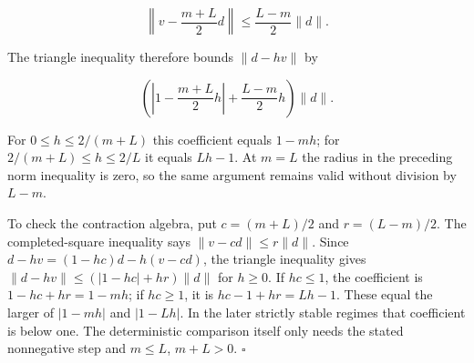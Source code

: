 \documentclass[11pt,a4paper]{article}
\begin{document}
\[\left\|v-\frac{m+L}{2}d\right\|\le\frac{L-m}{2}\|d\|.\]

The triangle inequality therefore bounds \(\|d-hv\|\) by

\[\left(\left|1-\frac{m+L}{2}h\right|+\frac{L-m}{2}h\right)\|d\|.\]

For \(0\le h\le2/(m+L)\) this coefficient equals \(1-mh\); for \(2/(m+L)\le h\le2/L\) it equals \(Lh-1\). At \(m=L\) the radius in the preceding norm inequality is zero, so the same argument remains valid without division by \(L-m\).




To check the contraction algebra, put \(c=(m+L)/2\) and \(r=(L-m)/2\). The completed-square inequality says \(\|v-cd\|\le r\|d\|\). Since \(d-hv=(1-hc)d-h(v-cd)\), the triangle inequality gives \(\|d-hv\|\le(|1-hc|+hr)\|d\|\) for \(h\ge0\). If \(hc\le1\), the coefficient is \(1-hc+hr=1-mh\); if \(hc\ge1\), it is \(hc-1+hr=Lh-1\). These equal the larger of \(|1-mh|\) and \(|1-Lh|\). In the later strictly stable regimes that coefficient is below one. The deterministic comparison itself only needs the stated nonnegative step and \(m\le L\), \(m+L>0\). \(\square\)
\end{document}
